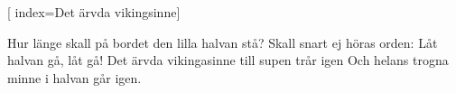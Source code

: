 

[
	index={Det ärvda vikingsinne}]		
	
\beginverse*						
Hur länge skall på bordet
den lilla halvan stå?
Skall snart ej höras orden:
Låt halvan gå, låt gå!
Det ärvda vikingasinne till supen trår igen 
Och helans trogna minne i halvan går igen. 
\endverse									
\endsong		
